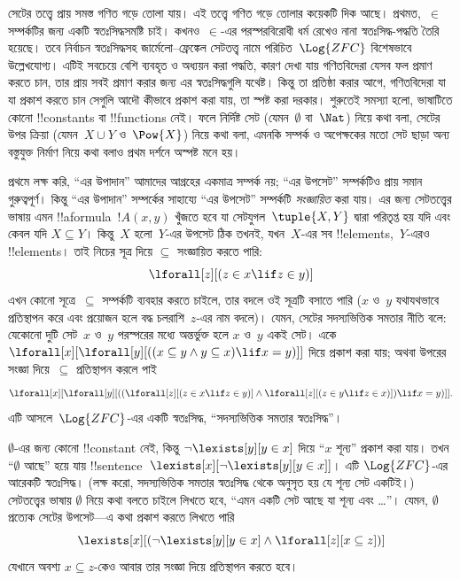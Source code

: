 \documentclass[../../../include/open-logic-section]{subfiles}
\begin{document}


সেটের তত্ত্বে প্রায় সমস্ত গণিত গড়ে তোলা যায়। এই তত্ত্বে গণিত গড়ে
তোলার কয়েকটি দিক আছে। প্রথমত,~$\in$ সম্পর্কটির জন্য একটি
স্বতঃসিদ্ধসমষ্টি চাই। কখনও~$\in$-এর পরস্পরবিরোধী ধর্ম রেখেও নানা
স্বতঃসিদ্ধ-পদ্ধতি তৈরি হয়েছে। তবে নির্বাচন স্বতঃসিদ্ধসহ
জার্মেলো--ফ্রেঙ্কেল সেটতত্ত্ব নামে পরিচিত~$\Log{ZFC}$ বিশেষভাবে
উল্লেখযোগ্য। এটিই সবচেয়ে বেশি ব্যবহৃত ও অধ্যয়ন করা পদ্ধতি, কারণ দেখা
যায় গণিতবিদেরা যেসব ফল প্রমাণ করতে চান, তার প্রায় সবই প্রমাণ করার
জন্য এর স্বতঃসিদ্ধগুলি যথেষ্ট। কিন্তু তা প্রতিষ্ঠা করার আগে,
গণিতবিদেরা যা যা প্রকাশ করতে চান সেগুলি আদৌ কীভাবে প্রকাশ করা যায়,
তা স্পষ্ট করা দরকার। শুরুতেই সমস্যা হলো, ভাষাটিতে কোনো !!{constant}s
বা !!{function}s নেই। ফলে নির্দিষ্ট সেট (যেমন~$\emptyset$ বা~$\Nat$)
নিয়ে কথা বলা, সেটের উপর ক্রিয়া (যেমন~$X \cup Y$ ও~$\Pow{X}$) নিয়ে
কথা বলা, এমনকি সম্পর্ক ও অপেক্ষকের মতো সেট ছাড়া অন্য বস্তুযুক্ত
নির্মাণ নিয়ে কথা বলাও প্রথম দর্শনে অস্পষ্ট মনে হয়।

প্রথমে লক্ষ করি, “এর উপাদান” আমাদের আগ্রহের একমাত্র সম্পর্ক নয়;
“এর উপসেট” সম্পর্কটিও প্রায় সমান গুরুত্বপূর্ণ। কিন্তু “এর উপাদান”
সম্পর্কের সাহায্যে “এর উপসেট” সম্পর্কটি \emph{সংজ্ঞায়িত} করা যায়।
এর জন্য সেটতত্ত্বের ভাষায় এমন !!a{formula}~$!A(x,y)$ খুঁজতে হবে যা
সেটযুগল~$\tuple{X,Y}$ দ্বারা পরিতৃপ্ত হয় যদি এবং কেবল যদি
$X \subseteq Y$। কিন্তু~$X$ হলো~$Y$-এর উপসেট ঠিক তখনই, যখন~$X$-এর
সব !!{element}s,~$Y$-এরও !!{element}s। তাই নিচের সূত্র দিয়ে
$\subseteq$ সংজ্ঞায়িত করতে পারি:
\[
\lforall[z][(z \in x \lif z \in y)]
\]
এখন কোনো সূত্রে~$\subseteq$ সম্পর্কটি ব্যবহার করতে চাইলে, তার বদলে ওই
সূত্রটি বসাতে পারি ($x$ ও~$y$ যথাযথভাবে প্রতিস্থাপন করে এবং প্রয়োজন
হলে বদ্ধ চলরাশি~$z$-এর নাম বদলে)। যেমন, সেটের সদস্যভিত্তিক সমতার নীতি
বলে: যেকোনো দুটি সেট~$x$ ও~$y$ পরস্পরের মধ্যে অন্তর্ভুক্ত হলে
$x$ ও~$y$ একই সেট। একে
$\lforall[x][\lforall[y][((x \subseteq y \land y
    \subseteq x) \lif x = y)]]$ দিয়ে প্রকাশ করা যায়; অথবা উপরের
সংজ্ঞা দিয়ে~$\subseteq$ প্রতিস্থাপন করলে পাই
\[
\lforall[x][\lforall[y][((\lforall[z][(z \in x \lif z \in y)] \land
    \lforall[z][(z \in y \lif z \in x)]) \lif x = y)]].
\]
এটি আসলে~$\Log{ZFC}$-এর একটি স্বতঃসিদ্ধ, “সদস্যভিত্তিক সমতার
স্বতঃসিদ্ধ”।

$\emptyset$-এর জন্য কোনো !!{constant} নেই, কিন্তু
$\lnot \lexists[y][y \in x]$ দিয়ে “$x$ শূন্য” প্রকাশ করা যায়। তখন
“$\emptyset$ আছে” হয়ে যায়
!!{sentence}~$\lexists[x][\lnot \lexists[y][y \in x]]$। এটি
$\Log{ZFC}$-এর আরেকটি স্বতঃসিদ্ধ। (লক্ষ করো, সদস্যভিত্তিক সমতার
স্বতঃসিদ্ধ থেকে অনুসৃত হয় যে শূন্য সেট একটিই।) সেটতত্ত্বের ভাষায়
$\emptyset$ নিয়ে কথা বলতে চাইলে লিখতে হবে, “এমন একটি সেট আছে যা শূন্য
এবং \dots”। যেমন, $\emptyset$ প্রত্যেক সেটের উপসেট—এ কথা প্রকাশ করতে
লিখতে পারি
\[
\lexists[x][(\lnot\lexists[y][y \in x] \land \lforall[z][x \subseteq
    z])]
\]
যেখানে অবশ্য $x \subseteq z$-কেও আবার তার সংজ্ঞা দিয়ে প্রতিস্থাপন
করতে হবে।
\end{document}

